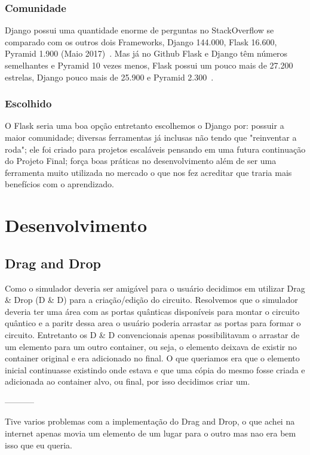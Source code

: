 \documentclass[a4paper, 12pt, oneside]{book}
\begin{document}
\subsection{Comunidade}
Django possui uma quantidade enorme de perguntas no StackOverflow se comparado com os outros dois Frameworks, Django 144.000, Flask 16.600, Pyramid 1.900 (Maio 2017)~\cite{stackoverflowtags}. Mas já no Github Flask e Django têm números semelhantes e Pyramid 10 vezes menos, Flask possui um pouco mais de 27.200 estrelas, Django pouco mais de 25.900 e Pyramid 2.300~\cite{github}.

\subsection{Escolhido}
O Flask seria uma boa opção entretanto escolhemos o Django por: possuir a maior comunidade; diversas ferramentas já inclusas não tendo que "reinventar a roda"; ele foi criado para projetos escaláveis pensando em uma futura continuação do Projeto Final; força boas práticas no desenvolvimento além de ser uma ferramenta muito utilizada no mercado o que nos fez acreditar que traria mais benefícios com o aprendizado.

\chapter{Desenvolvimento}
\thispagestyle{empty} 

\section{Drag and Drop}

Como o simulador deveria ser amigável para o usuário decidimos em utilizar Drag \& Drop (D \& D) para a criação/edição do circuito. Resolvemos que o simulador deveria ter uma área com as portas quânticas disponíveis para montar o circuito quântico e a paritr dessa area o usuário poderia arrastar as portas para formar o circuito. Entretanto os D \& D convencionais apenas possibilitavam o arrastar de um elemento para um outro container, ou seja, o elemento deixava de existir no container original e era adicionado no final. O que queriamos era que o elemento inicial continuasse existindo onde estava e que uma cópia do mesmo fosse criada e adicionada ao container alvo, ou final, por isso decidimos criar um.

-----------

Tive varios problemas com a implementação do Drag and Drop, o que achei na internet apenas movia um elemento de um lugar para o outro mas nao era bem isso que eu queria.
\end{document}
